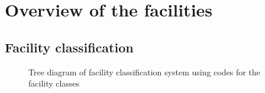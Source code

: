 %
\chapter{Overview of the facilities}
\label{chp:overview-facilities}


\section{Facility classification}



\begin{figure}
    \centering
    
    \caption{Tree diagram of facility classification system using codes for the
    facility classes}
\end{figure}
